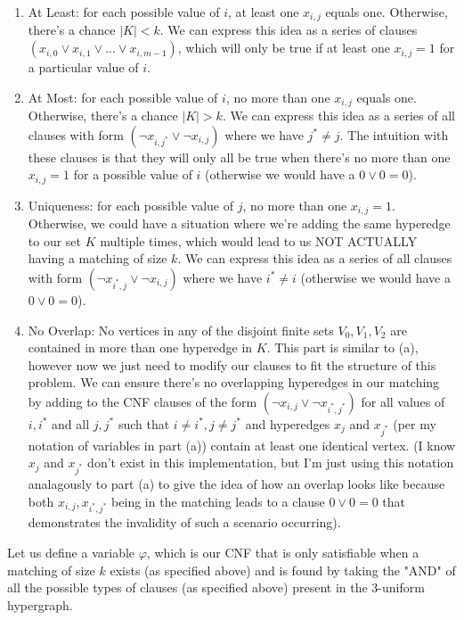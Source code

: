 \documentclass[11pt]{article}
\begin{document}
\begin{enumerate}
\begin{enumerate}
\begin{enumerate}
    \item At Least: for each possible value of $i$, at least one $x_{i,j}$ equals one. Otherwise, there's a chance $|K| < k$. We can express this idea as a series of clauses $(x_{i,0} \vee x_{i,1} \vee ... \vee x_{i,m-1})$, which will only be true if at least one $x_{i,j} = 1$ for a particular value of $i$.
    \item At Most: for each possible value of $i$, no more than one $x_{i,j}$ equals one. Otherwise, there's a chance $|K| > k$. We can express this idea as a series of all clauses with form $(\neg x_{i,j^*} \vee \neg x_{i,j})$ where we have $j^* \neq j$. The intuition with these clauses is that they will only all be true when there's no more than one $x_{i,j} = 1$ for a possible value of $i$ (otherwise we would have a $0 \vee 0 = 0$).
    \item Uniqueness: for each possible value of $j$, no more than one $x_{i,j} = 1$. Otherwise, we could have a situation where we're adding the same hyperedge to our set $K$ multiple times, which would lead to us NOT ACTUALLY having a matching of size $k$. We can express this idea as a series of all clauses with form $(\neg x_{i^*,j} \vee \neg x_{i,j})$ where we have $i^* \ne i$ (otherwise we would have a $0 \vee 0 = 0$).
    \item No Overlap: No vertices in any of the disjoint finite sets $V_0,V_1,V_2$ are contained in more than one hyperedge in $K$. This part is similar to (a), however now we just need to modify our clauses to fit the structure of this problem. We can ensure there's no overlapping hyperedges in our matching by adding to the CNF clauses of the form $(\neg x_{i,j} \vee \neg x_{i^*,j^*})$ for all values of $i, i^*$ and all $j,j^*$ such that $i \ne i^*, j \ne j^*$ and hyperedges $x_j$ and $x_{j^*}$ (per my notation of variables in part (a)) contain at least one identical vertex. (I know $x_j$ and $x_{j^*}$ don't exist in this implementation, but I'm just using this notation analagously to part (a) to give the idea of how an overlap looks like because both $x_{i,j}, x_{i^*,j^*}$ being in the matching leads to a clause $0 \vee 0 = 0$ that demonstrates the invalidity of such a scenario occurring). \\
\end{enumerate}

Let us define a variable $\varphi$, which is our CNF that is only satisfiable when a matching of size $k$ exists (as specified above) and is found by taking the "AND" of all the possible types of clauses (as specified above) present in the 3-uniform hypergraph. \\


\end{enumerate}
\end{enumerate}
\end{document}
